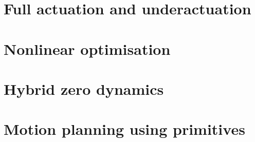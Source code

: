 \section{Full actuation and underactuation} \label{sec:underactuatedMaths}


\section{Nonlinear optimisation} \label{sec:nonlinopt}


\section{Hybrid zero dynamics} \label{sec:hzd}


\section{Motion planning using primitives}
 \label{sec:primplanning}